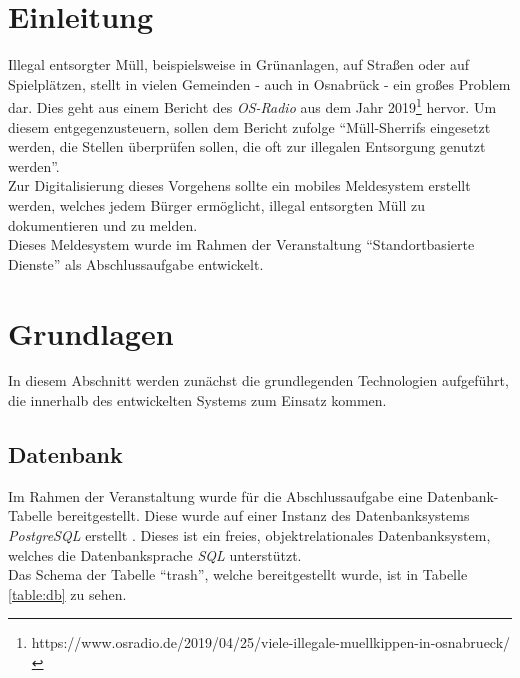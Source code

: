 \documentclass[a4paper, 11pt, DIV=11, listof=numbered, numbers=noenddot]{scrartcl}
\begin{document}
	\section{Einleitung}
	Illegal entsorgter Müll, beispielsweise in Grünanlagen, auf Straßen oder auf Spielplätzen, stellt in vielen Gemeinden - auch in Osnabrück - ein großes Problem dar. Dies geht aus einem Bericht des \textit{OS-Radio} aus dem Jahr 2019\footnote{https://www.osradio.de/2019/04/25/viele-illegale-muellkippen-in-osnabrueck/} hervor.
	Um diesem entgegenzusteuern, sollen dem Bericht zufolge \enquote{Müll-Sherrifs eingesetzt werden, die Stellen überprüfen sollen, die oft zur illegalen Entsorgung genutzt werden}.\\
	Zur Digitalisierung dieses Vorgehens sollte ein mobiles Meldesystem erstellt werden, welches jedem Bürger ermöglicht, illegal entsorgten Müll zu dokumentieren und zu melden.\\
	Dieses Meldesystem wurde im Rahmen der Veranstaltung \enquote{Standortbasierte Dienste} als Abschlussaufgabe entwickelt.

	\section{Grundlagen}
	In diesem Abschnitt werden zunächst die grundlegenden Technologien aufgeführt, die innerhalb des entwickelten Systems zum Einsatz kommen.

	\subsection{Datenbank}
	Im Rahmen der Veranstaltung wurde für die Abschlussaufgabe eine Datenbank-Tabelle bereitgestellt.
	Diese wurde auf einer Instanz des Datenbanksystems \textit{PostgreSQL} erstellt \cite{@Postgresql}.
	Dieses ist ein freies, objektrelationales Datenbanksystem, welches die Datenbanksprache \textit{SQL} unterstützt.\\
	Das Schema der Tabelle \enquote{trash}, welche bereitgestellt wurde, ist in Tabelle \ref{table:db} zu sehen.
\end{document}
